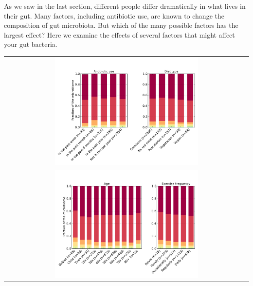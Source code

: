 \documentclass[10pt,letterpaper]{article}
\begin{document}
As we saw in the last section, different people differ dramatically in what lives in their gut. Many factors, including antibiotic use, are known to change the composition of gut microbiota. But which of the many possible factors has the largest effect? Here we examine the effects of several factors that might affect your gut bacteria.

\begin{framed}
\parbox{0.60\textwidth}{
\vspace{-3mm}
\begin{tabular}{ c }
\includegraphics[trim=0 0 0 1.5cm, clip, width=0.6\textwidth]{pdfs-mod1/fig6_a.pdf} \\
\includegraphics[trim=0 0 0 1.5cm, clip, width=0.6\textwidth]{pdfs-mod1/fig6_b.pdf}


\end{tabular}}
\end{framed}
\end{document}
